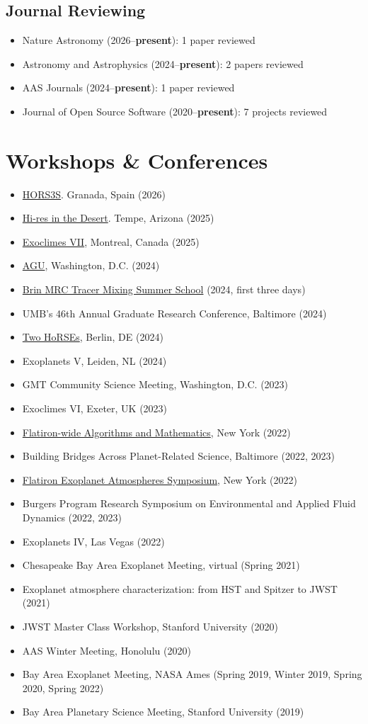 \documentclass[letterpaper,12pt]{article}
\newcommand{\shorterSection}[1]{\section{#1}}
\renewcommand{\small}{\normalsize}
\newcommand{\resumeItem}[2]{
  \item\small{
    \textbf{#1}{#2 \vspace{-2pt}}
  }
}
\newcommand{\resumeItemListStart}{\begin{itemize}}
\newcommand{\resumeItemListEnd}{\end{itemize}\vspace{-5pt}}
\begin{document}
\subsection{Journal Reviewing}
\resumeItemListStart
\resumeItem{}{Nature Astronomy (2026--\textbf{present}): 1 paper reviewed}
\resumeItem{}{Astronomy and Astrophysics (2024--\textbf{present}): 2 papers reviewed}
 \resumeItem{}{AAS Journals (2024--\textbf{present}): 1 paper reviewed}
\resumeItem{}{Journal of Open Source Software (2020--\textbf{present}): 7 projects reviewed}
\resumeItemListEnd


\shorterSection{Workshops \& Conferences}
\resumeItemListStart
\resumeItem{}{\href{https://sites.google.com/view/hors3s/home?authuser=0}{HORS3S}. Granada, Spain (2026)}
\resumeItem{}{\href{https://sites.google.com/asu.edu/hi-res-in-the-desert}{Hi-res in the Desert}. Tempe, Arizona (2025)}
\resumeItem{}{\href{https://exoclimes.org/}{Exoclimes VII}, Montreal, Canada (2025)}
\resumeItem{}{\href{https://www.agu.org/annual-meeting-2024}{AGU}, Washington, D.C. (2024)}
\resumeItem{}{\href{https://brinmrc.umd.edu/programs/schools/summer24/summer24-school-mixing.html}{Brin MRC Tracer Mixing Summer School} (2024, first three days)}
\resumeItem{}{UMB's 46th Annual Graduate Research Conference, Baltimore (2024)}
\resumeItem{}{\href{https://sites.google.com/view/two-horses/}{Two HoRSEs}, Berlin, DE (2024)}
\resumeItem{}{Exoplanets V, Leiden, NL (2024)}
\resumeItem{}{GMT Community Science Meeting, Washington, D.C. (2023)}
\resumeItem{}{Exoclimes VI, Exeter, UK (2023)}
\resumeItem{}{\href{https://www.simonsfoundation.org/event/2022-flatiron-wide-algorithms-and-mathematics/}{Flatiron-wide Algorithms and Mathematics}, New York (2022)}
\resumeItem{}{Building Bridges Across Planet-Related Science, Baltimore (2022, 2023)}
\resumeItem{}{\href{https://www.simonsfoundation.org/event/flatiron-exoplanet-atmospheres-symposium/}{Flatiron Exoplanet Atmospheres Symposium}, New York (2022)}
\resumeItem{}{Burgers Program Research
Symposium on Environmental and Applied Fluid Dynamics (2022, 2023)}
\resumeItem{}{Exoplanets IV, Las Vegas (2022)}
\resumeItem{}{Chesapeake Bay Area Exoplanet Meeting, virtual (Spring 2021)}
\resumeItem{}{Exoplanet atmosphere characterization: from HST and Spitzer to JWST (2021)}
\resumeItem{}{JWST Master Class Workshop, Stanford University (2020)}
\resumeItem{}{AAS Winter Meeting, Honolulu (2020)}
\resumeItem{}{Bay Area Exoplanet Meeting, NASA Ames (Spring 2019, Winter 2019, Spring 2020, Spring 2022)}
\resumeItem{}{Bay Area Planetary Science Meeting, Stanford University (2019)}
\resumeItemListEnd
\end{document}

